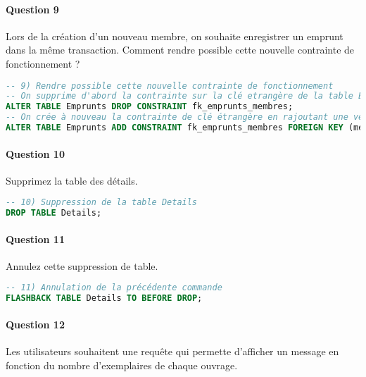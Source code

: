 \documentclass[10pt, oneside]{article}
\begin{document}
\paragraph{Question 9} Lors de la création d'un nouveau membre, on souhaite enregistrer un emprunt dans la même transaction. Comment rendre possible cette nouvelle contrainte de fonctionnement ?

\begin{lstlisting}[language=sql, title=Question 9, label=QIII9]
-- 9) Rendre possible cette nouvelle contrainte de fonctionnement
-- On supprime d'abord la contrainte sur la clé etrangère de la table Emprunts
ALTER TABLE Emprunts DROP CONSTRAINT fk_emprunts_membres;
-- On crée à nouveau la contrainte de clé étrangère en rajoutant une vérification de cette contrainte uniquement à la fin de la transaction
ALTER TABLE Emprunts ADD CONSTRAINT fk_emprunts_membres FOREIGN KEY (membre) REFERENCES Membres (numero) INITIALLY DEFERRED;

\end{lstlisting}


\paragraph{Question 10} Supprimez la table des détails.

\begin{lstlisting}[language=sql, title=Question 10, label=QIII10]
-- 10) Suppression de la table Details
DROP TABLE Details;
\end{lstlisting}


\paragraph{Question 11}  Annulez cette suppression de table.

\begin{lstlisting}[language=sql, title=Question 11, label=QIII11]
-- 11) Annulation de la précédente commande
FLASHBACK TABLE Details TO BEFORE DROP;
\end{lstlisting}


\paragraph{Question 12} Les utilisateurs souhaitent une requête qui permette d'afficher un message en fonction du nombre d'exemplaires de chaque ouvrage.
\end{document}
